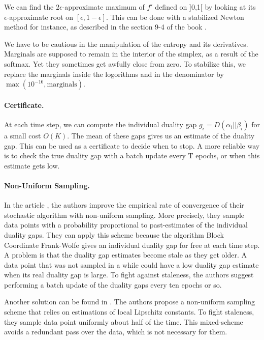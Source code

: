 \documentclass{article}
\DeclareMathOperator{\1}{\mathbb{1}}
\begin{document}
We can find the $2\epsilon$-approximate maximum of $f'$ defined on ]0,1[ by looking at its $\epsilon$-approximate root on $[\epsilon,1-\epsilon]$.
This can be done with a stabilized Newton method for instance, as described in the section 9-4 of the book \cite{press_numerical_1992}.

We have to be cautious in the manipulation of the entropy and its derivatives.
Marginals are supposed to remain in the interior of the simplex, as a result of the softmax.
Yet they sometimes get awfully close from zero.
To stabilize this, we replace the marginals inside the logorithms and in the denominator by $\max(10^{-16}, \textrm{marginals})$.


\paragraph{Certificate.}
At each time step, we can compute the individual duality gap $g_i = D(\alpha_i || \beta_i)$ for a small cost $O(K)$.
The mean of these gaps gives us an estimate of the duality gap.
This can be used as a certificate to decide when to stop.
A more reliable way is to check the true duality gap with a batch update every T epochs, or when this estimate gets low.

\paragraph{Non-Uniform Sampling.} 
In the article \cite{osokin_minding_2016}, the authors improve the empirical rate of convergence of their stochastic algorithm with non-uniform sampling.
More precisely, they sample data points with a probability proportional to past-estimates of the individual duality gaps.
They can apply this scheme because the algorithm Block Coordinate Frank-Wolfe \cite{lacoste-julien_block-coordinate_2012} gives an individual duality gap for free at each time step.
A problem is that the duality gap estimates become stale as they get older.
A data point that was not sampled in a while could have a low duality gap estimate when its real duality gap is large.
To fight against staleness, the authors suggest performing a batch update of the duality gaps every ten epochs or so.

Another solution can be found in \cite{schmidt_non-uniform_2015}.
The authors propose a non-uniform sampling scheme that relies on estimations of local Lipschitz constants.
To fight staleness, they sample data point uniformly about half of the time.
This mixed-scheme avoids a redundant pass over the data, which is not necessary for them.
\end{document}
